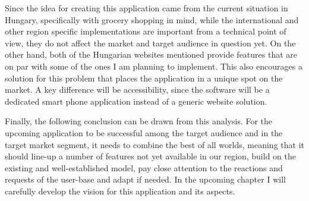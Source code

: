 Since the idea for creating this application came from the current situation in Hungary, specifically with grocery shopping in mind, while the international and other region specific implementations are important from a technical point of view, they do not affect the market and target audience in question yet. On the other hand, both of the Hungarian websites mentioned provide features that are on par with some of the ones I am planning to implement. This also encourages a solution for this problem that places the application in a unique spot on the market. A key difference will be accessibility, since the software will be a dedicated smart phone application instead of a generic website solution. 

Finally, the following conclusion can be drawn from this analysis. For the upcoming application to be successful among the target audience and in the target market segment, it needs to combine the best of all worlds, meaning that it should line-up a number of features not yet available in our region, build on the existing and well-established model, pay close attention to the reactions and requests of the user-base and adapt if needed. In the upcoming chapter I will carefully develop the vision for this application and its aspects.